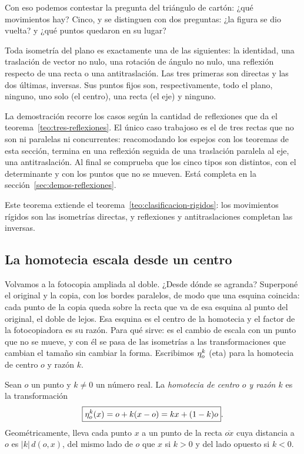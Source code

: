 Con eso podemos contestar la pregunta del triángulo de cartón: ¿qué movimientos hay? Cinco, y
se distinguen con dos preguntas: ¿la figura se dio vuelta? y ¿qué puntos quedaron en su lugar?

\begin{teorema}\label{teo:clasificacion-isometrias}
Toda isometría del plano es exactamente una de las siguientes: la identidad, una traslación
de vector no nulo, una rotación de ángulo no nulo, una reflexión respecto de una recta o una
antitraslación. Las tres primeras son directas y las dos últimas, inversas. Sus puntos fijos
son, respectivamente, todo el plano, ninguno, uno solo (el centro), una recta (el eje) y
ninguno.
\end{teorema}

La demostración recorre los casos según la cantidad de reflexiones que da el
teorema~\ref{teo:tres-reflexiones}. El único caso trabajoso es el de tres rectas que no son ni
paralelas ni concurrentes: reacomodando los espejos con los teoremas de esta sección, termina en
una reflexión seguida de una traslación paralela al eje, una antitraslación. Al final se
comprueba que los cinco tipos son distintos, con el determinante y con los puntos que no se
mueven. Está completa en la sección~\ref{sec:demos-reflexiones}.

Este teorema extiende el teorema~\ref{teo:clasificacion-rigidos}: los movimientos rígidos son
las isometrías directas, y reflexiones y antitraslaciones completan las inversas.

\subsection{La homotecia escala desde un centro}\label{sec:homotecia}

Volvamos a la fotocopia ampliada al doble. ¿Desde dónde se agranda? Superponé el original y la
copia, con los bordes paralelos, de modo que una esquina coincida: cada punto de la copia queda
sobre la recta que va de esa esquina al punto del original, el doble de lejos. Esa esquina es
el centro de la homotecia y el factor de la fotocopiadora es su razón. Para qué sirve: es el
cambio de escala con un punto que no se mueve, y con él se pasa de las isometrías a las
transformaciones que cambian el tamaño sin cambiar la forma. Escribimos \(\eta_{o}^{k}\) (eta)
para la homotecia de centro \(o\) y razón \(k\).

\begin{definicion}[Homotecia]\label{def:homotecia}
Sean \(o\) un punto y \(k\neq0\) un número real. La \emph{homotecia de centro \(o\) y razón
\(k\)} es la transformación
\[
  \boxed{\eta_{o}^{k}(x)=o+k(x-o)=kx+(1-k)o}.
\]
Geométricamente, lleva cada punto \(x\) a un punto de la recta \(\overline{ox}\) cuya distancia a
\(o\) es \(|k|\,d(o,x)\), del mismo lado de \(o\) que \(x\) si \(k>0\) y del lado opuesto si
\(k<0\).
\end{definicion}

